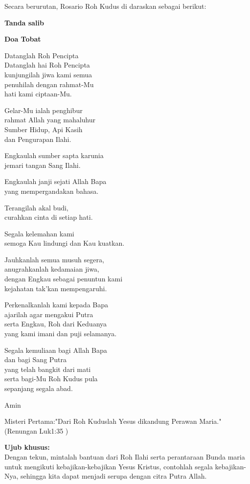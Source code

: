 \normalsize
Secara berurutan, Rosario Roh Kudus di daraskan sebagai berikut:

{\bf Tanda salib}

{\bf Doa Tobat}

Datanglah Roh Pencipta\\
Datanglah hai Roh Pencipta\\
kunjungilah jiwa kami semua\\
penuhilah dengan rahmat-Mu\\
hati kami ciptaan-Mu.

Gelar-Mu ialah penghibur\\
rahmat Allah yang mahaluhur\\
Sumber Hidup, Api Kasih\\
dan Pengurapan Ilahi.

Engkaulah sumber sapta karunia\\
jemari tangan Sang Ilahi.

Engkaulah janji sejati Allah Bapa\\
yang mempergandakan bahasa.

Terangilah akal budi,\\
curahkan cinta di setiap hati.

Segala kelemahan kami\\
semoga Kau lindungi dan Kau kuatkan.

Jauhkanlah semua musuh segera,\\
anugrahkanlah kedamaian jiwa,\\
dengan Engkau sebagai penuntun kami\\
kejahatan tak'kan mempengaruhi.

Perkenalkanlah kami kepada Bapa\\
ajarilah agar mengakui Putra\\
serta Engkau, Roh dari Keduanya\\
yang kami imani dan puji selamanya.

Segala kemuliaan bagi Allah Bapa\\
dan bagi Sang Putra\\
yang telah bangkit dari mati\\
serta bagi-Mu Roh Kudus pula\\
sepanjang segala abad.

Amin

Misteri Pertama:"Dari Roh Kuduslah Yesus dikandung Perawan Maria."\\
(Renungan Luk1:35 )

{\bf Ujub khusus:}\\
Dengan tekun, mintalah bantuan dari Roh Ilahi serta perantaraan Bunda maria untuk mengikuti kebajikan-kebajikan Yesus Kristus, contohlah segala kebajikan-Nya, sehingga kita dapat menjadi serupa dengan citra Putra Allah.

